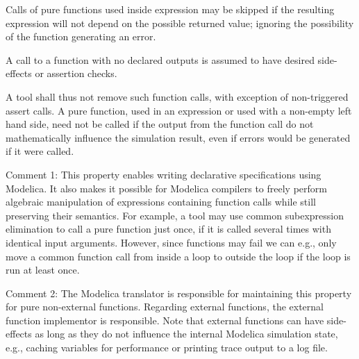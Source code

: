 Calls of pure functions used inside expression may be skipped if the
resulting expression will not depend on the possible returned value;
ignoring the possibility of the function generating an error.

A call to a function with no declared outputs is assumed to have desired
side-effects or assertion checks.

\begin{nonnormative}
A tool shall thus not remove such function calls, with exception of non-triggered assert calls.  A pure function, used in an expression or used with
a non-empty left hand side, need not be called if the output from the function call do not mathematically influence the simulation result, even if
errors would be generated if it were called.
\end{nonnormative}

\begin{nonnormative}
Comment 1: This property enables writing declarative
specifications using Modelica. It also makes it possible for Modelica
compilers to freely perform algebraic manipulation of expressions
containing function calls while still preserving their semantics. For
example, a tool may use common subexpression elimination to call a pure
function just once, if it is called several times with identical input
arguments. However, since functions may fail we can e.g., only move a
common function call from inside a loop to outside the loop if the loop
is run at least once.
\end{nonnormative}

\begin{nonnormative}
Comment 2: The Modelica translator is responsible for
maintaining this property for pure non-external functions. Regarding
external functions, the external function implementor is responsible.
Note that external functions can have side-effects as long as they do
not influence the internal Modelica simulation state, e.g., caching
variables for performance or printing trace output to a log file.
\end{nonnormative}

